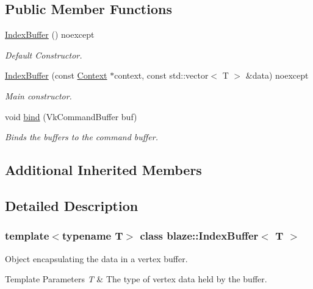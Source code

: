 \subsection*{Public Member Functions}
\begin{DoxyCompactItemize}
\item 
\mbox{\label{classblaze_1_1IndexBuffer_ae31bddb3488eb4020ee6e7b5bd2cb09f}} 
\hyperlink{classblaze_1_1IndexBuffer_ae31bddb3488eb4020ee6e7b5bd2cb09f}{Index\+Buffer} () noexcept
\begin{DoxyCompactList}\small\item\em Default Constructor. \end{DoxyCompactList}\item 
\hyperlink{classblaze_1_1IndexBuffer_aa28bed3bd8c8bad8e2f3126c11709c21}{Index\+Buffer} (const \hyperlink{classblaze_1_1Context}{Context} $\ast$context, const std\+::vector$<$ T $>$ \&data) noexcept
\begin{DoxyCompactList}\small\item\em Main constructor. \end{DoxyCompactList}\item 
void \hyperlink{classblaze_1_1IndexBuffer_a51ce12bd53a32ca6e6dabb37a623a922}{bind} (Vk\+Command\+Buffer buf)
\begin{DoxyCompactList}\small\item\em Binds the buffers to the command buffer. \end{DoxyCompactList}\end{DoxyCompactItemize}
\subsection*{Additional Inherited Members}


\subsection{Detailed Description}
\subsubsection*{template$<$typename T$>$\newline
class blaze\+::\+Index\+Buffer$<$ T $>$}

Object encapsulating the data in a vertex buffer. 


\begin{DoxyTemplParams}{Template Parameters}
{\em T} & The type of vertex data held by the buffer. \\
\hline
\end{DoxyTemplParams}


